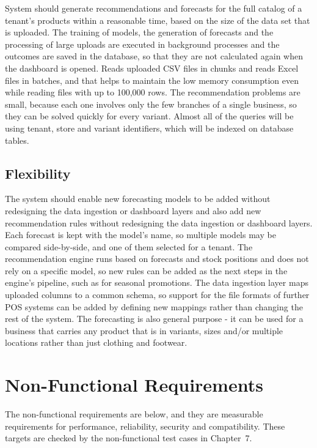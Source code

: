 \documentclass{StockSense}
\begin{document}
System should generate recommendations and forecasts for the full catalog of a tenant's products within a reasonable time, based on the size of the data set that is uploaded. The training of models, the generation of forecasts and the processing of large uploads are executed in background processes and the outcomes are saved in the database, so that they are not calculated again when the dashboard is opened. Reads uploaded CSV files in chunks and reads Excel files in batches, and that helps to maintain the low memory consumption even while reading files with up to 100,000 rows. The recommendation problems are small, because each one involves only the few branches of a single business, so they can be solved quickly for every variant. Almost all of the queries will be using tenant, store and variant identifiers, which will be indexed on database tables.

\subsection{Flexibility}

The system should enable new forecasting models to be added without redesigning the data ingestion or dashboard layers and also add new recommendation rules without redesigning the data ingestion or dashboard layers. Each forecast is kept with the model's name, so multiple models may be compared side-by-side, and one of them selected for a tenant. The recommendation engine runs based on forecasts and stock positions and does not rely on a specific model, so new rules can be added as the next steps in the engine's pipeline, such as for seasonal promotions. The data ingestion layer maps uploaded columns to a common schema, so support for the file formats of further POS systems can be added by defining new mappings rather than changing the rest of the system. The forecasting is also general purpose - it can be used for a business that carries any product that is in variants, sizes and/or multiple locations rather than just clothing and footwear.

\section{Non-Functional Requirements}

The non-functional requirements are below, and they are measurable requirements for performance, reliability, security and compatibility. These targets are checked by the non-functional test cases in Chapter~7.
\end{document}
